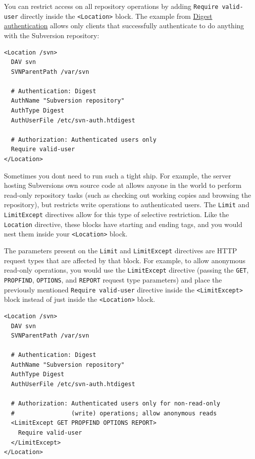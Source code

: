You can restrict access on all repository operations by adding
\texttt{Require\ valid-user} directly inside the
\texttt{\textless{}Location\textgreater{}} block. The example from
\hyperref[svn.serverconfig.httpd.authn.digest]{Digest authentication}
allows only clients that successfully authenticate to do anything with
the Subversion repository:

\begin{verbatim}
<Location /svn>
  DAV svn
  SVNParentPath /var/svn

  # Authentication: Digest
  AuthName "Subversion repository"
  AuthType Digest
  AuthUserFile /etc/svn-auth.htdigest

  # Authorization: Authenticated users only
  Require valid-user
</Location>
\end{verbatim}

Sometimes you don\textquotesingle t need to run such a tight ship. For
example, the server hosting Subversion\textquotesingle s own source code
at \href{https://svn.apache.org/repos/asf/subversion/}{} allows anyone
in the world to perform read-only repository tasks (such as checking out
working copies and browsing the repository), but restricts write
operations to authenticated users. The \texttt{Limit} and
\texttt{LimitExcept} directives allow for this type of selective
restriction. Like the \texttt{Location} directive, these blocks have
starting and ending tags, and you would nest them inside your
\texttt{\textless{}Location\textgreater{}} block.

The parameters present on the \texttt{Limit} and \texttt{LimitExcept}
directives are HTTP request types that are affected by that block. For
example, to allow anonymous read-only operations, you would use the
\texttt{LimitExcept} directive (passing the \texttt{GET},
\texttt{PROPFIND}, \texttt{OPTIONS}, and \texttt{REPORT} request type
parameters) and place the previously mentioned
\texttt{Require\ valid-user} directive inside the
\texttt{\textless{}LimitExcept\textgreater{}} block instead of just
inside the \texttt{\textless{}Location\textgreater{}} block.

\begin{verbatim}
<Location /svn>
  DAV svn
  SVNParentPath /var/svn

  # Authentication: Digest
  AuthName "Subversion repository"
  AuthType Digest
  AuthUserFile /etc/svn-auth.htdigest

  # Authorization: Authenticated users only for non-read-only
  #                (write) operations; allow anonymous reads
  <LimitExcept GET PROPFIND OPTIONS REPORT>
    Require valid-user
  </LimitExcept>
</Location>
\end{verbatim}

